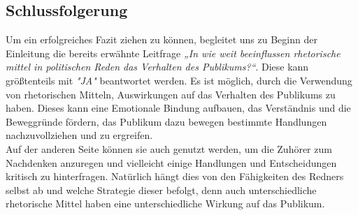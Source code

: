 \subsection{Schlussfolgerung}
\label{sec: Schlussfolgerung}
Um ein erfolgreiches Fazit ziehen zu können, begleitet uns zu Beginn der Einleitung die bereits erwähnte 
Leitfrage \textit{„In wie weit beeinflussen rhetorische mittel in politischen Reden das Verhalten des 
Publikums?“}. Diese kann größtenteils mit \textit{"JA"} beantwortet werden. Es ist möglich, durch die Verwendung von 
rhetorischen Mitteln, Auswirkungen auf das Verhalten des Publikums zu haben. Dieses kann eine Emotionale 
Bindung aufbauen, das Verständnis und die Beweggründe fördern, das Publikum dazu bewegen bestimmte 
Handlungen nachzuvollziehen und zu ergreifen. \\Auf der anderen Seite können sie auch genutzt werden, 
um die Zuhörer zum Nachdenken anzuregen und vielleicht einige Handlungen und Entscheidungen kritisch 
zu hinterfragen. Natürlich hängt dies von den Fähigkeiten des Redners selbst ab und welche 
Strategie dieser befolgt, denn auch unterschiedliche rhetorische Mittel haben eine unterschiedliche 
Wirkung auf das Publikum.
